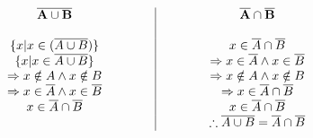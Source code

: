 \documentclass[]{article}
\begin{document}
\[
\begin{tabular}{{c@{\hspace{1.5cm}}|@{\hspace{1.5cm}}c
}}
    $\mathbf{\overline{A \cup B}}$ & $\mathbf{\overline{A} \cap \overline{B}}$ \\
    \\
    $\{x \text{\textbar} x \in (\overline{A \cup B})\}$ & $x \in \overline{A} \cap \overline{B}$ \\
        $\{x \text{\textbar} x \in \overline{A \cup B}\}$ & $\Rightarrow x \in \overline{A} \land x \in \overline{B}$ \\
    $\Rightarrow x \notin A \land x \notin B$ & $\Rightarrow x \notin A \land x \notin B$ \\
    $\Rightarrow x \in \overline{A} \land x \in \overline{B}$ & $\Rightarrow x \in \overline{A} \cap \overline{B}$\\
    $x \in \overline{A} \cap \overline{B}$ & $x \in \overline{A} \cap \overline{B}$\\
    & $\therefore  \overline{A \cup B} = \overline{A} \cap \overline{B}$\\
\end{tabular}
    \]
\end{document}
